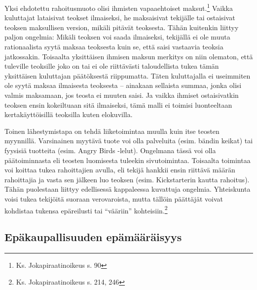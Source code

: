 \documentclass[titlepage,12pt]{article}
\begin{document}

Yksi ehdotettu rahoitusmuoto olisi ihmisten vapaaehtoiset
maksut.\footnote{Ks. Jokapiraatinoikeus s. 90} Vaikka kuluttajat
lataisivat teokset ilmaiseksi, he maksaisivat tekijälle tai ostaisivat
teoksen maksullisen version, mikäli pitävät teoksesta.  Tähän
kuitenkin liittyy paljon ongelmia: Mikäli teoksen voi saada
ilmaiseksi, tekijällä ei ole muuta rationaalista syytä maksaa
teoksesta kuin se, että saisi vastaavia teoksia jatkossakin.
Toisaalta yksittäisen ihmisen maksun merkitys on niin olematon, että
tuleville teoksille joko on tai ei ole riittävästi taloudellista tukea
tämän yksittäisen kuluttajan päätöksestä riippumatta.  Täten
kuluttajalla ei useimmiten ole syytä maksaa ilmaisesta teoksesta --
ainakaan sellaista summaa, jonka olisi valmis maksamaan, jos teosta ei
muuten saisi.  Ja vaikka ihmiset ostaisivatkin teoksen ensin
kokeiltuaan sitä ilmaiseksi, tämä malli ei toimisi luonteeltaan
kertakäyttöisillä teoksilla kuten elokuvilla.



Toinen lähestymistapa on tehdä liiketoimintaa muulla kuin itse teosten
myynnillä.  Varsinainen myytävä tuote voi olla palveluita
(esim. bändin keikat) tai fyysisiä tuotteita (esim. Angry Birds
-lelut).  Ongelmana tässä voi olla päätoiminnasta eli teosten
luomisesta tuleekin sivutoimintaa.  Toisaalta toimintaa voi koittaa
tukea rahoittajien avulla, eli tekijä hankkii ensin riittävä määrän
rahoittajia ja vasta sen jälkeen luo teoksen (esim. Kickstarterin
kautta rahoitus).  Tähän puolestaan liittyy edellisessä kappaleessa
kuvattuja ongelmia.  Yhteiskunta voisi tukea tekijöitä suoraan
verovaroista, mutta tällöin päättäjät voivat kohdistaa tukensa
epäreilusti tai ``vääriin'' kohteisiin.\footnote{Ks. Jokapiraatinoikeus
  s. 214, 246}







\subsection{Epäkaupallisuuden epämääräisyys}
\end{document}
